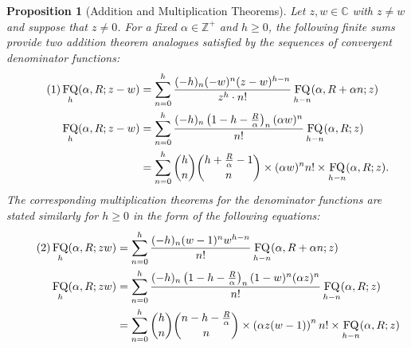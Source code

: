 \documentclass[12pt,reqno]{article}
\numberwithin{sfootnote}{section}
\numberwithin{equation}{section}
\newcommand{\tagonce}[0]{
     \addtocounter{equation}{1}
     \tag{\theequation}
}
\theoremstyle{DefaultTheoremStyle}
\newtheorem{prop}[theorem]{Proposition}
\theoremstyle{definition}
\DeclareMathOperator{\FQ}{FQ}
\begin{document}
\begin{prop}[Addition and Multiplication Theorems] 
\label{cor_HypU_fn_FiniteSums_Involving_FQhz} 
Let $z, w \in \mathbb{C}$ with $z \neq w$ and suppose that $z \neq 0$. 
For a fixed $\alpha \in \mathbb{Z}^{+}$ and $h \geq 0$, the 
following finite sums provide two 
addition theorem analogues satisfied by the 
sequences of convergent denominator functions: 
\begin{align*} 
\tagonce\label{eqn_FQhaRz_HypU_FiniteSum_Idents_stmt} 
\FQ_h(\alpha, R; z-w) & = 
     \sum_{n=0}^{h} \frac{(-h)_n (-w)^n (z-w)^{h-n}}{z^{h} \cdot n!} 
     \FQ_{h-n}(\alpha, R+\alpha n; z) \\ 
\FQ_h(\alpha, R; z-w) & = 
     \sum_{n=0}^{h} \frac{(-h)_n \left(1-h-\frac{R}{\alpha}\right)_n 
     (\alpha w)^{n}}{n!} 
     \FQ_{h-n}(\alpha, R; z) \\ 
     & = 
     \sum_{n=0}^{h} \binom{h}{n} \binom{h+\frac{R}{\alpha}-1}{n} 
     \times (\alpha w)^{n} n! \times 
     \FQ_{h-n}(\alpha, R; z). 
\end{align*} 
The corresponding multiplication theorems for the 
denominator functions are stated similarly for $h \geq 0$ 
in the form of the following equations: 
\begin{align*} 
\tagonce\label{eqn_FQhaRz_HypU_FiniteSum_Idents-v_MultThms_stmts} 
\FQ_h(\alpha, R; zw) & = 
     \sum_{n=0}^{h} \frac{(-h)_n (w-1)^n w^{h-n}}{n!} 
     \FQ_{h-n}(\alpha, R+\alpha n; z) \\ 
\FQ_h(\alpha, R; zw) & = 
     \sum_{n=0}^{h} \frac{(-h)_n \left(1-h-\frac{R}{\alpha}\right)_n 
     (1-w)^{n} (\alpha z)^{n}}{n!} 
     \FQ_{h-n}(\alpha, R; z) \\ 
     & = 
     \sum_{n=0}^{h} 
     \binom{h}{n} \binom{n-h-\frac{R}{\alpha}}{n} \times 
     \left(\alpha z (w-1)\right)^{n} n! \times 
     \FQ_{h-n}(\alpha, R; z) 
\end{align*} 
\end{prop} 
\end{document}

